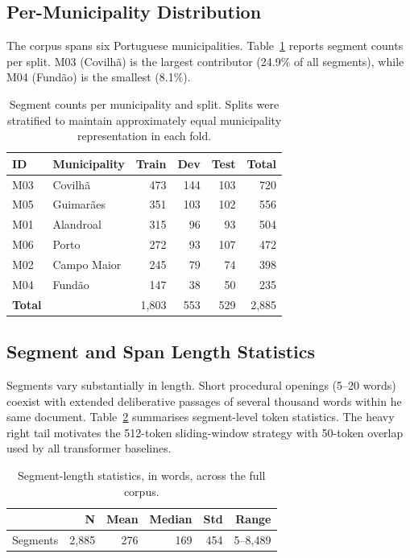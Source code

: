 \documentclass[11pt]{article}
\begin{document}
\subsection{Per-Municipality Distribution}
\label{app:dataset:municipalities}

The corpus spans six Portuguese municipalities.
Table~\ref{tab:municipality-stats} reports segment counts per split. M03 (Covilhã) is the largest contributor (24.9\% of all segments), while M04 (Fundão) is the smallest (8.1\%).

\begin{table}[h]
\centering
\small
\begin{tabular}{llrrrr}
\toprule
\textbf{ID} & \textbf{Municipality} & \textbf{Train} & \textbf{Dev} & \textbf{Test} & \textbf{Total} \\
\midrule
M03 & Covilhã     & 473 & 144 & 103 & 720 \\
M05 & Guimarães   & 351 & 103 & 102 & 556 \\
M01 & Alandroal   & 315 &  96 &  93 & 504 \\
M06 & Porto       & 272 &  93 & 107 & 472 \\
M02 & Campo Maior & 245 &  79 &  74 & 398 \\
M04 & Fundão      & 147 &  38 &  50 & 235 \\
\midrule
\textbf{Total} & & 1{,}803 & 553 & 529 & 2{,}885 \\
\bottomrule
\end{tabular}
\caption{Segment counts per municipality and split. Splits were stratified to maintain approximately equal municipality representation in each fold.}
\label{tab:municipality-stats}
\end{table}

\subsection{Segment and Span Length Statistics}
\label{app:dataset:lengths}

Segments vary substantially in length. Short procedural openings (5--20 words) coexist with extended deliberative passages of several thousand words within he same document. Table~\ref{tab:segment-length} summarises segment-level token statistics. The heavy right tail motivates the 512-token sliding-window strategy with 50-token overlap used by all transformer baselines.

\begin{table}[h]
\centering
\small
\begin{tabular}{lrrrrr}
\toprule
& \textbf{N} & \textbf{Mean} & \textbf{Median} & \textbf{Std} & \textbf{Range} \\
\midrule
Segments & 2{,}885 & 276 & 169 & 454 & 5--8{,}489 \\
\bottomrule
\end{tabular}
\caption{Segment-length statistics, in words, across the full corpus.}
\label{tab:segment-length}
\end{table}
\end{document}
